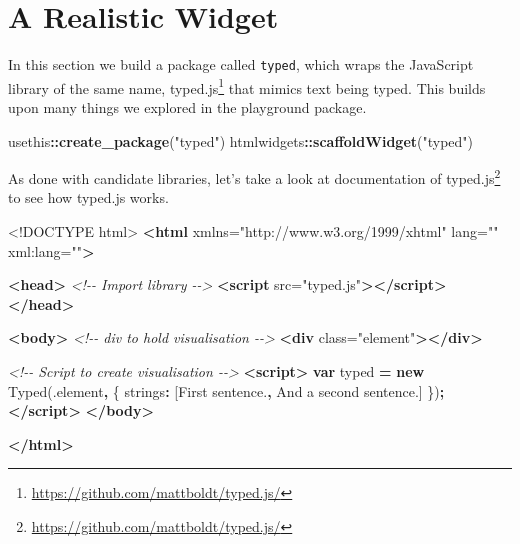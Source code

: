 \documentclass[
]{krantz}
\makeatletter
\newenvironment{Shaded}{\begin{snugshade}}{\end{snugshade}}
\newcommand{\CommentTok}[1]{\textcolor[rgb]{0.37,0.37,0.37}{\textit{#1}}}
\newcommand{\DataTypeTok}[1]{\textcolor[rgb]{0.27,0.27,0.27}{#1}}
\newcommand{\KeywordTok}[1]{\textcolor[rgb]{0.27,0.27,0.27}{\textbf{#1}}}
\newcommand{\NormalTok}[1]{#1}
\newcommand{\OperatorTok}[1]{\textcolor[rgb]{0.43,0.43,0.43}{\textbf{#1}}}
\newcommand{\OtherTok}[1]{\textcolor[rgb]{0.37,0.37,0.37}{#1}}
\newcommand{\StringTok}[1]{\textcolor[rgb]{0.5,0.5,0.5}{#1}}
\renewcommand{\href}[2]{#2\footnote{\url{#1}}}
\newenvironment{kframe}{%
\medskip{}
\setlength{\fboxsep}{.8em}
 \def\at@end@of@kframe{}%
 \ifinner\ifhmode%
  \def\at@end@of@kframe{\end{minipage}}%
  \begin{minipage}{\columnwidth}%
 \fi\fi%
 \def\FrameCommand##1{\hskip\@totalleftmargin \hskip-\fboxsep
 \colorbox{shadecolor}{##1}\hskip-\fboxsep
     \hskip-\linewidth \hskip-\@totalleftmargin \hskip\columnwidth}%
 \MakeFramed {\advance\hsize-\width
   \@totalleftmargin\z@ \linewidth\hsize
   \@setminipage}}%
 {\par\unskip\endMakeFramed%
 \at@end@of@kframe}
\renewenvironment{Shaded}{\begin{kframe}}{\end{kframe}}
\makeatother
\begin{document}
\hypertarget{a-realistic-widget}{%
\chapter{A Realistic Widget}\label{a-realistic-widget}}

In this section we build a package called \texttt{typed}, which wraps the JavaScript library of the same name, \href{https://github.com/mattboldt/typed.js/}{typed.js} that mimics text being typed. This builds upon many things we explored in the playground package.

\begin{Shaded}
\begin{Highlighting}[]
\NormalTok{usethis}\OperatorTok{::}\KeywordTok{create\_package}\NormalTok{(}\StringTok{"typed"}\NormalTok{)}
\NormalTok{htmlwidgets}\OperatorTok{::}\KeywordTok{scaffoldWidget}\NormalTok{(}\StringTok{"typed"}\NormalTok{)}
\end{Highlighting}
\end{Shaded}

As done with candidate libraries, let's take a look at documentation of \href{https://github.com/mattboldt/typed.js/}{typed.js} to see how typed.js works.

\begin{Shaded}
\begin{Highlighting}[]
\DataTypeTok{\textless{}!DOCTYPE }\NormalTok{html}\DataTypeTok{\textgreater{}}
\KeywordTok{\textless{}html}\OtherTok{ xmlns=}\StringTok{"http://www.w3.org/1999/xhtml"}\OtherTok{ lang=}\StringTok{""}\OtherTok{ xml:lang=}\StringTok{""}\KeywordTok{\textgreater{}}

\KeywordTok{\textless{}head\textgreater{}}
  \CommentTok{\textless{}!{-}{-} Import library {-}{-}\textgreater{}}
  \KeywordTok{\textless{}script}\OtherTok{ src=}\StringTok{"typed.js"}\KeywordTok{\textgreater{}\textless{}/script\textgreater{}}
\KeywordTok{\textless{}/head\textgreater{}}

\KeywordTok{\textless{}body\textgreater{}}
  \CommentTok{\textless{}!{-}{-} div to hold visualisation {-}{-}\textgreater{}}
  \KeywordTok{\textless{}div}\OtherTok{ class=}\StringTok{"element"}\KeywordTok{\textgreater{}\textless{}/div\textgreater{}}

  \CommentTok{\textless{}!{-}{-} Script to create visualisation {-}{-}\textgreater{}}
  \KeywordTok{\textless{}script\textgreater{}}
    \KeywordTok{var}\NormalTok{ typed }\OperatorTok{=} \KeywordTok{new}\NormalTok{ Typed(}\StringTok{\textquotesingle{}.element\textquotesingle{}}\OperatorTok{,}\NormalTok{ \{}
      \DataTypeTok{strings}\OperatorTok{:}\NormalTok{ [}\StringTok{\textquotesingle{}First sentence.\textquotesingle{}}\OperatorTok{,} \StringTok{\textquotesingle{}And a second sentence.\textquotesingle{}}\NormalTok{]}
\NormalTok{    \})}\OperatorTok{;}
  \KeywordTok{\textless{}/script\textgreater{}}
\KeywordTok{\textless{}/body\textgreater{}}

\KeywordTok{\textless{}/html\textgreater{}}
\end{Highlighting}
\end{Shaded}
\end{document}
